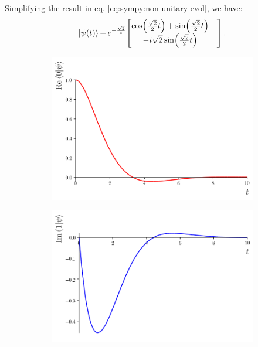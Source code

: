 Simplifying the result in eq. \eqref{eq:sympy:non-unitary-evol}, we have:
\begin{equation}
  \ket{\psi(t)} \repr e^{-\frac{\sqrt{2}}{t}} \mqty[
    \cos(\frac{\sqrt{2}}{2}t) + \sin(\frac{\sqrt{2}}{2}t)& \\
                     -i\sqrt{2} \sin(\frac{\sqrt{2}}{2}t)&
  ] \,\text{.}
\end{equation}

\begin{figure} %
  \centering
  \begin{subfigure}{0.49\textwidth}
    \includegraphics[width=\linewidth]{img/2ldetect/re_psi0_t.png}
    \subcaption{}\label{fig:absorbed-qubit-components:re0}
  \end{subfigure}
  \begin{subfigure}{0.49\textwidth}
    \includegraphics[width=\linewidth]{img/2ldetect/im_psi1_t.png}

\end{subfigure}
\end{figure}
